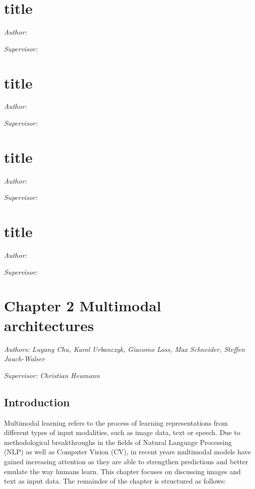 \documentclass[
]{krantz}
\begin{document}
\hypertarget{title-4}{%
\chapter{title}\label{title-4}}

\emph{Author: }

\emph{Supervisor: }

\hypertarget{title-5}{%
\chapter{title}\label{title-5}}

\emph{Author: }

\emph{Supervisor: }

\hypertarget{title-6}{%
\chapter{title}\label{title-6}}

\emph{Author: }

\emph{Supervisor: }

\hypertarget{title-7}{%
\chapter{title}\label{title-7}}

\emph{Author: }

\emph{Supervisor: }

\hypertarget{chapter-2-multimodal-architectures}{%
\chapter{Chapter 2 Multimodal architectures}\label{chapter-2-multimodal-architectures}}

\emph{Authors: Luyang Chu, Karol Urbanczyk, Giacomo Loss, Max Schneider, Steffen Jauch-Walser}

\emph{Supervisor: Christian Heumann}

\hypertarget{introduction-1}{%
\section{Introduction}\label{introduction-1}}

Multimodal learning refers to the process of learning representations from different types of input modalities, such as image data, text or speech.
Due to methodological breakthroughs in the fields of Natural Language Processing (NLP) as well as Computer Vision (CV), in recent years multimodal models have gained increasing attention as they are able to strengthen predictions and better emulate the way humans learn.
This chapter focuses on discussing images and text as input data.
The remainder of the chapter is structured as follows:
\end{document}

